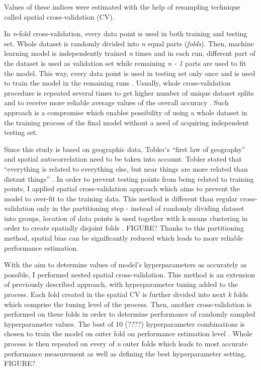 \documentclass{amuthesis}
\begin{document}
Values of these indices were estimated with the help of resampling
technique called spatial cross-validation (CV).

In \emph{n}-fold cross-validation, every data point is used in both
training and testing set. Whole dataset is randomly divided into
\emph{n} equal parts (\emph{folds}). Then, machine learning model is
independently trained \emph{n} times and in each run, different part of
the dataset is used as validation set while remaining \emph{n - 1} parts
are used to fit the model. This way, every data point is used in testing
set only once and is used to train the model in the remaining runs
\autocite{jiao_performance_2016}. Usually, whole cross-validation
procedure is repeated several times to get higher number of unique
dataset splits and to receive more reliable average values of the
overall accuracy \autocite{varga_validation_2021}. Such approach is a
compromise which enables possibility of using a whole dataset in the
training process of the final model without a need of acquiring
independent testing set.

Since this study is based on geographic data, Tobler's ``first law of
geography'' and spatial autocorrelation need to be taken into account.
Tobler stated that ``everything is related to everything else, but near
things are more related than distant things''
\autocite{tobler_computer_1970}. In order to prevent testing points from
being related to training points, I applied spatial cross-validation
approach which aims to prevent the model to over-fit to the training
data. This method is different than regular cross-validation only in the
partitioning step - instead of randomly dividing dataset into groups,
location of data points is used together with k-means clustering
\autocite{brenning_spatial_2012} in order to create spatially disjoint
folds \autocite{lovelace_geocomputation_2019}. FIGURE? Thanks to this
partitioning method, spatial bias can be significantly reduced which
leads to more reliable performance estimation.

With the aim to determine values of model's hyperparameters as
accurately as possible, I performed nested spatial cross-validation.
This method is an extension of previously described approach, with
hyperparameter tuning added to the process. Each fold created in the
spatial CV is further divided into next \emph{k} folds which comprise
the tuning level of the process. Then, another cross-validation is
performed on these folds in order to determine performance of randomly
sampled hyperparameter values. The best of 10 (????) hyperparameter
combinations is chosen to train the model on outer fold on performance
estimation level \autocite{schratz_hyperparameter_2019}. Whole process
is then repeated on every of \emph{n} outer folds which leads to most
accurate performance measurement as well as defining the best
hyperparameter setting. FIGURE?
\end{document}
